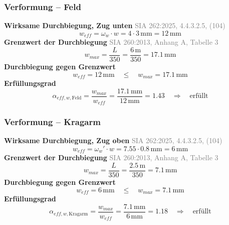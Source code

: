 \documentclass[11pt,a4paper]{article}
\newcommand{\normref}[1]{{\small\textcolor{gray}{#1}}}
\begin{document}
\subsubsection{Verformung – Feld}
\noindent\textbf{Wirksame Durchbiegung, Zug unten} \hfill \normref{SIA 262:2025, 4.4.3.2.5, (104)}
\begin{equation*}
w_{eff} = \omega_w \cdot w = 4 \cdot 3\,\mathrm{mm} = 12\,\mathrm{mm}
\end{equation*}
\noindent\textbf{Grenzwert der Durchbiegung} \hfill \normref{SIA 260:2013, Anhang A, Tabelle 3}
\begin{equation*}
w_{max} = \frac{L}{350} = \frac{6\,\mathrm{m}}{350} = 17.1\,\mathrm{mm}
\end{equation*}
\noindent\textbf{Durchbiegung gegen Grenzwert}
\begin{equation*}
w_{eff} = 12\,\mathrm{mm} \quad \le \quad w_{max} = 17.1\,\mathrm{mm}
\end{equation*}
\noindent\textbf{Erfüllungsgrad}
\begin{equation*}
\alpha_{eff,w,\text{Feld}} = \frac{w_{max}}{w_{eff}} = \frac{17.1\,\mathrm{mm}}{12\,\mathrm{mm}} = 1.43 \quad \Rightarrow \quad \text{erfüllt}
\end{equation*}
\subsubsection{Verformung – Kragarm}
\noindent\textbf{Wirksame Durchbiegung, Zug oben} \hfill \normref{SIA 262:2025, 4.4.3.2.5, (104)}
\begin{equation*}
w_{eff} = \omega_w' \cdot w = 7.55 \cdot 0.8\,\mathrm{mm} = 6\,\mathrm{mm}
\end{equation*}
\noindent\textbf{Grenzwert der Durchbiegung} \hfill \normref{SIA 260:2013, Anhang A, Tabelle 3}
\begin{equation*}
w_{max} = \frac{L}{350} = \frac{2.5\,\mathrm{m}}{350} = 7.1\,\mathrm{mm}
\end{equation*}
\noindent\textbf{Durchbiegung gegen Grenzwert}
\begin{equation*}
w_{eff} = 6\,\mathrm{mm} \quad \le \quad w_{max} = 7.1\,\mathrm{mm}
\end{equation*}
\noindent\textbf{Erfüllungsgrad}
\begin{equation*}
\alpha_{eff,w,\text{Kragarm}} = \frac{w_{max}}{w_{eff}} = \frac{7.1\,\mathrm{mm}}{6\,\mathrm{mm}} = 1.18 \quad \Rightarrow \quad \text{erfüllt}
\end{equation*}
\end{document}
